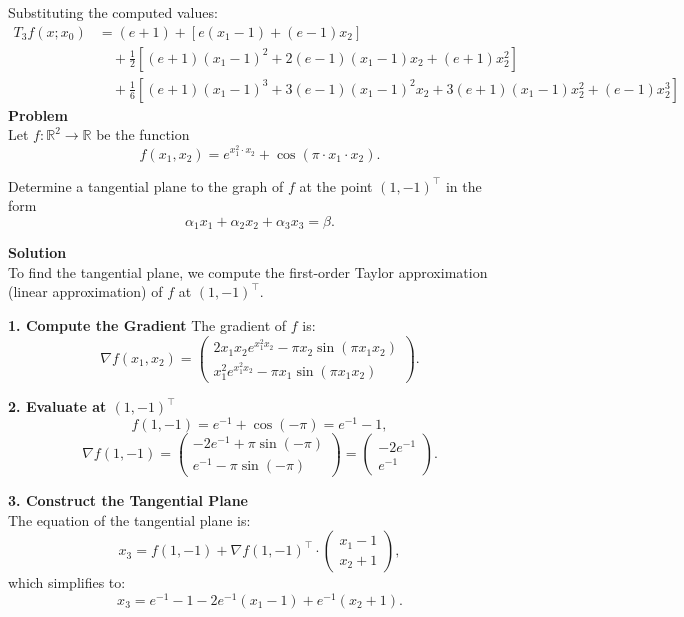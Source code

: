 \documentclass{article}
\begin{document}
Substituting the computed values:
\begin{align*}
T_3f(x; x_0) &= (e + 1) + [e(x_1-1) + (e-1)x_2] \\
&\quad + \frac{1}{2} \left[ (e+1)(x_1-1)^2 + 2(e-1)(x_1-1)x_2 + (e+1)x_2^2 \right] \\
&\quad + \frac{1}{6} \left[ (e+1)(x_1-1)^3 + 3(e-1)(x_1-1)^2x_2 + 3(e+1)(x_1-1)x_2^2 + (e-1)x_2^3 \right]
\end{align*}
\vspace{2mm}
\textbf{Problem} \\
Let \( f: \mathbb{R}^{2} \to \mathbb{R} \) be the function 
\[ f(x_{1}, x_{2}) = e^{x_{1}^{2} \cdot x_{2}} + \cos(\pi \cdot x_{1} \cdot x_{2}). \]

Determine a tangential plane to the graph of \( f \) at the point \( (1, -1)^{\top} \) in the form 
\[ \alpha_{1}x_{1} + \alpha_{2}x_{2} + \alpha_{3}x_{3} = \beta. \]

\textbf{Solution} \\

To find the tangential plane, we compute the first-order Taylor approximation (linear approximation) of \( f \) at \( (1, -1)^{\top} \).

\textbf{1. Compute the Gradient}
The gradient of \( f \) is:
\[ \nabla f(x_{1}, x_{2}) = 
\begin{pmatrix}
2x_{1}x_{2}e^{x_{1}^{2}x_{2}} - \pi x_{2} \sin(\pi x_{1}x_{2}) \\
x_{1}^{2}e^{x_{1}^{2}x_{2}} - \pi x_{1} \sin(\pi x_{1}x_{2})
\end{pmatrix}. \]

\textbf{2. Evaluate at \( (1, -1)^{\top} \)}
\[ f(1, -1) = e^{-1} + \cos(-\pi) = e^{-1} - 1, \]
\[ \nabla f(1, -1) = 
\begin{pmatrix}
-2e^{-1} + \pi \sin(-\pi) \\
e^{-1} - \pi \sin(-\pi)
\end{pmatrix} = 
\begin{pmatrix}
-2e^{-1} \\
e^{-1}
\end{pmatrix}. \]

\textbf{3. Construct the Tangential Plane}\\
The equation of the tangential plane is:
\[ x_{3} = f(1, -1) + \nabla f(1, -1)^{\top} \cdot \begin{pmatrix} x_{1} - 1 \\ x_{2} + 1 \end{pmatrix}, \]
which simplifies to:
\[ x_{3} = e^{-1} - 1 - 2e^{-1}(x_{1} - 1) + e^{-1}(x_{2} + 1). \]
\end{document}

